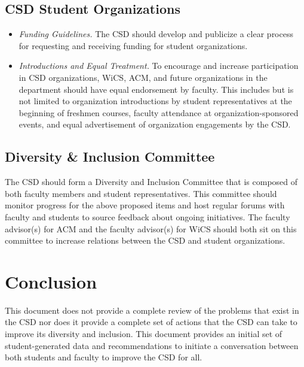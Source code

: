 \documentclass{article}
\begin{document}
\subsection{CSD Student Organizations}
\begin{itemize}
\item
\emph{Funding Guidelines.}
The CSD should develop and publicize a clear process for requesting and receiving funding for student organizations.
\item
\emph{Introductions and Equal Treatment.}
To encourage and increase participation in CSD organizations, WiCS, ACM, and future organizations in 
the department should have equal endorsement by faculty. This includes but is not limited to organization introductions by student
representatives at the beginning of freshmen courses, faculty attendance at organization-sponsored events, and equal 
advertisement of organization engagements by the CSD. 
\end{itemize}

\subsection{Diversity \& Inclusion Committee} 
The CSD should form a Diversity and Inclusion Committee that is composed of both faculty members and 
student representatives. This committee should monitor progress for the above proposed items and host regular forums with 
faculty and students to source feedback about ongoing initiatives. The faculty 
advisor(s) for ACM and the faculty advisor(s)
for WiCS should both sit on this committee to increase relations between the CSD and student organizations. 

\section{Conclusion}\label{conclusion}
This document does not provide a complete review of the problems that exist in the CSD nor does 
it provide a complete set of actions that the CSD can take to improve its diversity and inclusion.
This document provides an initial set of student-generated data and recommendations to initiate a conversation 
between both students and faculty to improve the CSD for all.
\end{document}
